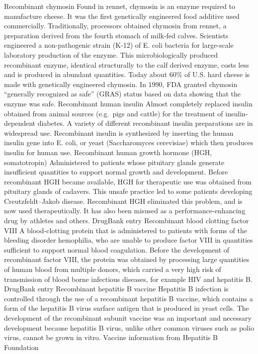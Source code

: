 Recombinant chymosin
Found in rennet, chymosin is an enzyme required to manufacture cheese. It was the first genetically engineered food additive used commercially. Traditionally, processors obtained chymosin from rennet, a preparation derived from the fourth stomach of milk-fed calves. Scientists engineered a non-pathogenic strain (K-12) of E. coli bacteria for large-scale laboratory production of the enzyme. This microbiologically produced recombinant enzyme, identical structurally to the calf derived enzyme, costs less and is produced in abundant quantities. Today about 60\% of U.S. hard cheese is made with genetically engineered chymosin. In 1990, FDA granted chymosin ``generally recognized as safe'' (GRAS) status based on data showing that the enzyme was safe.
Recombinant human insulin
Almost completely replaced insulin obtained from animal sources (e.g.~pigs and cattle) for the treatment of insulin-dependent diabetes. A variety of different recombinant insulin preparations are in widespread use. Recombinant insulin is synthesized by inserting the human insulin gene into E. coli, or yeast (Saccharomyces cerevisiae) which then produces insulin for human use.
Recombinant human growth hormone (HGH, somatotropin)
Administered to patients whose pituitary glands generate insufficient quantities to support normal growth and development. Before recombinant HGH became available, HGH for therapeutic use was obtained from pituitary glands of cadavers. This unsafe practice led to some patients developing Creutzfeldt--Jakob disease. Recombinant HGH eliminated this problem, and is now used therapeutically. It has also been misused as a performance-enhancing drug by athletes and others. DrugBank entry
Recombinant blood clotting factor VIII
A blood-clotting protein that is administered to patients with forms of the bleeding disorder hemophilia, who are unable to produce factor VIII in quantities sufficient to support normal blood coagulation. Before the development of recombinant factor VIII, the protein was obtained by processing large quantities of human blood from multiple donors, which carried a very high risk of transmission of blood borne infectious diseases, for example HIV and hepatitis B. DrugBank entry
Recombinant hepatitis B vaccine
Hepatitis B infection is controlled through the use of a recombinant hepatitis B vaccine, which contains a form of the hepatitis B virus surface antigen that is produced in yeast cells. The development of the recombinant subunit vaccine was an important and necessary development because hepatitis B virus, unlike other common viruses such as polio virus, cannot be grown in vitro. Vaccine information from Hepatitis B Foundation

